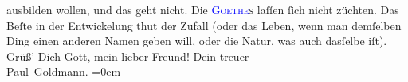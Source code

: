               ausbilden wollen, und das geht nicht. Die \textsc{\textcolor{blue}{Goethe}{}\ledrightnote{\textcolor{blue}{Johann Wolfgang von Goethe}}s} laſſen ſich nicht züchten. Das
               Beſte in der Entwickelung {\pb}thut der Zufall (oder das
               Leben, wenn man demſelben Ding einen anderen Namen geben will, oder die Natur, was
               auch dasſelbe iſt).\pend
           \pstart
           Grüß’ Dich Gott, mein lieber Freund!\pend
           \pstart
           Dein treuer {\\[\baselineskip]}\spacefill\mbox{Paul Goldmann.}\pend
           \leftskip=0em{}\endnumbering{}\begin{anhang}\end{anhang}
      